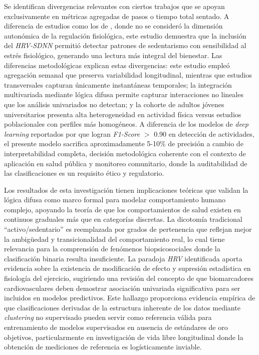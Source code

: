 Se identifican divergencias relevantes con ciertos trabajos que se apoyan exclusivamente en métricas agregadas de pasos o tiempo total sentado. A diferencia de estudios como los de \cite{ShamahLevy2023}, donde no se consideró la dimensión autonómica de la regulación fisiológica, este estudio demuestra que la inclusión del \textit{HRV-SDNN} permitió detectar patrones de sedentarismo con sensibilidad al estrés fisiológico, generando una lectura más integral del bienestar. Las diferencias metodológicas explican estas divergencias: este estudio empleó agregación semanal que preserva variabilidad longitudinal, mientras que estudios transversales capturan únicamente instantáneas temporales; la integración multivariada mediante lógica difusa permite capturar interacciones no lineales que los análisis univariados no detectan; y la cohorte de adultos jóvenes universitarios presenta alta heterogeneidad en actividad física versus estudios poblacionales con perfiles más homogéneos. A diferencia de los modelos de \textit{deep learning} reportados por \cite{Janidarmian2017} que logran \textit{F1-Score} $>$ 0.90 en detección de actividades, el presente modelo sacrifica aproximadamente 5-10\% de precisión a cambio de interpretabilidad completa, decisión metodológica coherente con el contexto de aplicación en salud pública y monitoreo comunitario, donde la auditabilidad de las clasificaciones es un requisito ético y regulatorio.


Los resultados de esta investigación tienen implicaciones teóricas que validan la lógica difusa como marco formal para modelar comportamiento humano complejo, apoyando la teoría de que los comportamientos de salud existen en continuos graduales más que en categorías discretas. La dicotomía tradicional ``activo/sedentario'' es reemplazada por grados de pertenencia que reflejan mejor la ambigüedad y transicionalidad del comportamiento real, lo cual tiene relevancia para la comprensión de fenómenos biopsicosociales donde la clasificación binaria resulta insuficiente. La paradoja \textit{HRV} identificada aporta evidencia sobre la existencia de modificación de efecto y supresión estadística en fisiología del ejercicio, sugiriendo una revisión del concepto de que biomarcadores cardiovasculares deben demostrar asociación univariada significativa para ser incluidos en modelos predictivos. Este hallazgo proporciona evidencia empírica de que clasificaciones derivadas de la estructura inherente de los datos mediante \textit{clustering} no supervisado pueden servir como referencia válida para entrenamiento de modelos supervisados en ausencia de estándares de oro objetivos, particularmente en investigación de vida libre longitudinal donde la obtención de mediciones de referencia es logísticamente inviable.

